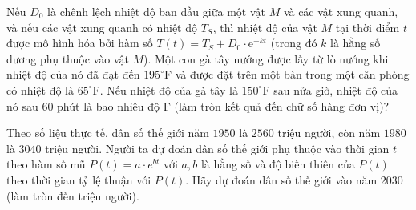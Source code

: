 \begin{bt}%
	Nếu $D_0$ là chênh lệch nhiệt độ ban đầu giữa một vật $M$ và các vật xung quanh, và nếu các vật xung quanh có nhiệt độ $T_S$, thì nhiệt độ của vật $M$ tại thời điểm $t$ được mô hình hóa bởi hàm số $T(t)=T_S+D_0 \cdot \mathrm{e}^{-kt}$ (trong đó $k$ là hằng số dương phụ thuộc vào vật $M$). Một con gà tây nướng được lấy từ lò nướng khi nhiệt độ của nó đã đạt đến $195^\circ$F và được đặt trên một bàn trong một căn phòng có nhiệt độ là $65^\circ$F. Nếu nhiệt độ của gà tây là $150^\circ$F sau nửa giờ, nhiệt độ của nó sau $60$ phút là bao nhiêu độ F (làm tròn kết quả đến chữ số hàng đơn vị)? 
\end{bt}

\begin{bt}%

	Theo số liệu thực tế, dân số thế giới năm $1950$ là $2560$ triệu người, còn năm $1980$ là $3040$ triệu người. Người ta dự đoán dân số thế giới phụ thuộc vào thời gian $t$ theo hàm số mũ $P\left( t \right) = a\cdot{e^{bt}}$ với $a, b$  là hằng số và độ biến thiên của $P(t)$ theo thời gian tỷ lệ thuận với $P\left( t \right)$. Hãy dự đoán dân số thế giới vào năm 2030 (làm tròn đến triệu người).
\end{bt}


